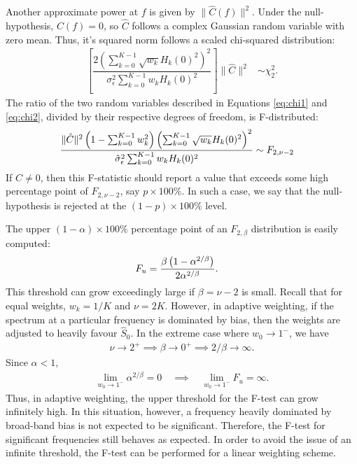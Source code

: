 Another approximate power at $f$ is given by $\|\hat{C}(f)\|^2$.  Under the null-hypothesis, $C(f)=0$, so $\hat{C}$ follows a complex Gaussian random variable with zero mean.  Thus, it's squared norm follows a scaled chi-squared distribution:
\begin{align}
    \left[\dfrac{2 \left(\sum_{k=0}^{K-1} \sqrt{w_k}H_k(0)^2\right)^2 }{ \sigma_\epsilon^2 \sum_{k=0}^{K-1} w_k H_k(0)^2}\right]\|\hat{C}\|^2 & \sim \chi_2^2. \label{eq:chi2}
\end{align}
The ratio of the two random variables described in Equations \eqref{eq:chi1} and \eqref{eq:chi2}, divided by their respective degrees of freedom, is F-distributed:
\begin{align}
    \dfrac{\|\hat{C}\|^2\left(1-\sum_{k=0}^{K-1} w_k^2\right) \left(\sum_{k=0}^{K-1} \sqrt{w_k}H_k(0)^2\right)^2}{\hat{\sigma}_\epsilon^2\sum_{k=0}^{K-1} w_k H_k(0)^2} & \sim F_{2,\nu-2} \label{eq:Fdist}\index{F-test}
\end{align}
If $C\neq 0$, then this F-statistic should report a value that exceeds some high percentage point of $F_{2,\nu-2}$, say $p\times 100\%$.  In such a case, we say that the null-hypothesis is rejected at the $(1-p)\times100\%$ level.

The upper $(1-\alpha)\times100\%$ percentage point of an $F_{2,\beta}$ distribution is easily computed:
\begin{align}
    F_u & = \dfrac{\beta\left(1-\alpha^{2/\beta}\right)}{2\alpha^{2/\beta}}. \index{F-test}
\end{align}
This threshold can grow exceedingly large if $\beta=\nu-2$ is small.  Recall that for equal weights, $w_k=1/K$ and $\nu=2K$.  However, in adaptive weighting, if the spectrum at a particular frequency is dominated by bias, then the weights are adjusted to heavily favour $\hat{S}_0$.  In the extreme case where $w_0\to1^{-}$, we have 
\begin{align*}
    \nu\to2^{+}\implies\beta\to0^{+}\implies 2/\beta\to\infty.
\end{align*}
Since $\alpha < 1$,
\begin{align*}
    \lim_{w_0\to1^{-}} \alpha^{2/\beta} = 0 \quad \implies \quad \lim_{w_0\to1^{-}} F_u = \infty.
\end{align*}
Thus, in adaptive weighting, the upper threshold for the F-test can grow infinitely high.  In this situation, however, a frequency heavily dominated by broad-band bias is not expected to be significant.  Therefore, the F-test for significant frequencies still behaves as expected.  In order to avoid the issue of an infinite threshold, the F-test can be performed for a linear weighting scheme.

